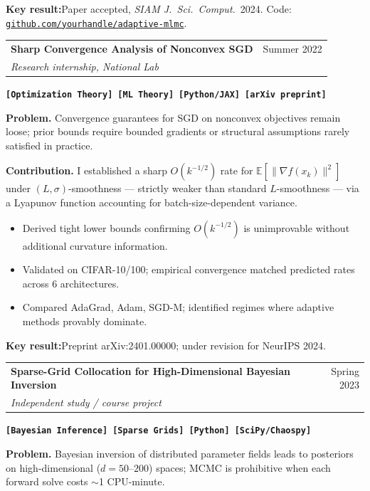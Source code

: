\documentclass[10pt,letterpaper]{article}
\makeatletter
\newcommand{\projecthead}[3]{%
  \noindent
  \begin{tabularx}{\linewidth}{@{}X r@{}}
    {\large\bfseries\color{NavyDeep}#1} & {\small\color{SubtleGray}#3}\\[-2pt]
    {\small\itshape\color{AccentTeal}#2} & \\
  \end{tabularx}%
  \vspace{2pt}%
}
\newcommand{\cvtag}[1]{%
  \mbox{\small\bfseries\color{AccentTeal}\texttt{[#1]}}\,%
}
\newcommand{\keyresult}[1]{%
  \vspace{3pt}%
  \noindent\colorbox{TagBg}{%
    \parbox{\dimexpr\linewidth-2\fboxsep\relax}{%
      \small\color{NavyDeep}%
      \textbf{Key result:}\enspace#1%
    }%
  }%
  \vspace{3pt}%
}
\newcommand{\eq}[1]{$#1$}
\makeatother
\begin{document}
\keyresult{Paper accepted, \textit{SIAM J.\ Sci.\ Comput.}\ 2024. Code: \href{https://github.com/yourhandle/adaptive-mlmc}{\texttt{github.com/yourhandle/adaptive-mlmc}}.}

\vspace{8pt}

\projecthead
  {Sharp Convergence Analysis of Nonconvex SGD}
  {Research internship, National Lab}
  {Summer 2022}

\noindent\cvtag{Optimization Theory} \cvtag{ML Theory} \cvtag{Python/JAX} \cvtag{arXiv preprint}

\vspace{4pt}
\textbf{Problem.}\enspace
Convergence guarantees for SGD on nonconvex objectives remain loose;
prior bounds require bounded gradients or structural assumptions rarely satisfied in practice.

\textbf{Contribution.}\enspace
I established a sharp \eq{O(k^{-1/2})} rate for
\eq{\mathbb{E}[\|\nabla f(x_k)\|^2]} under \eq{(L,\sigma)}-smoothness — strictly
weaker than standard \eq{L}-smoothness — via a Lyapunov function accounting for
batch-size-dependent variance.

\begin{itemize}
  \item Derived tight lower bounds confirming \eq{O(k^{-1/2})} is unimprovable without
        additional curvature information.
  \item Validated on CIFAR-10/100; empirical convergence matched predicted rates across
        6 architectures.
  \item Compared AdaGrad, Adam, SGD-M; identified regimes where adaptive methods
        provably dominate.
\end{itemize}

\keyresult{Preprint arXiv:2401.00000; under revision for NeurIPS 2024.}

\vspace{8pt}

\projecthead
  {Sparse-Grid Collocation for High-Dimensional Bayesian Inversion}
  {Independent study / course project}
  {Spring 2023}

\noindent\cvtag{Bayesian Inference} \cvtag{Sparse Grids} \cvtag{Python} \cvtag{SciPy/Chaospy}

\vspace{4pt}
\textbf{Problem.}\enspace
Bayesian inversion of distributed parameter fields leads to posteriors on
high-dimensional (\eq{d=50\text{--}200}) spaces; MCMC is prohibitive when each
forward solve costs \eq{\sim}1 CPU-minute.
\end{document}
